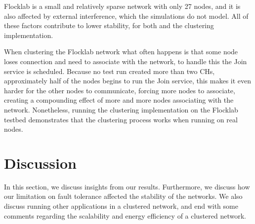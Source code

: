 \begin{newtext}
Flocklab is a small and relatively sparse network with only 27 nodes, and it is also affected by external interference, which the simulations do not model. All of these factors contribute to lower stability, for both \atwo{} and the clustering implementation. 

When clustering the Flocklab network what often happens is that some node loses connection and need to associate with the network, to handle this the Join service is scheduled. Because no test run created more than two CHs, approximately half of the nodes begins to run the Join service, this makes it even harder for the other nodes to communicate, forcing more nodes to associate, creating a compounding effect of more and more nodes associating with the network. Nonetheless, running the clustering implementation on the Flocklab testbed demonstrates that the clustering process works when running on real nodes.
\end{newtext}


\section{Discussion}
\label{section:evaluation-discussion}
In this section, we discuss insights from our results. Furthermore, we discuss how our limitation on fault tolerance affected the stability of the networks. We also discuss running other applications in a clustered network, and end with some comments regarding the scalability and energy efficiency of a clustered network.


